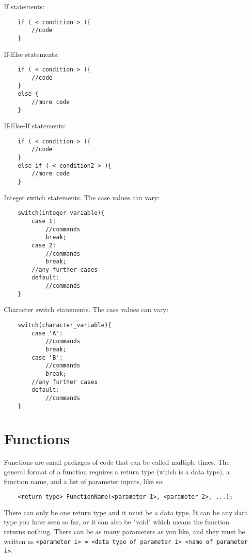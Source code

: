 If statements:
\begin{verbatim}
    if ( < condition > ){
        //code
    }
\end{verbatim}

If-Else statements:
\begin{verbatim}
    if ( < condition > ){
        //code
    }
    else {
        //more code
    }
\end{verbatim}

If-Else-If statements:
\begin{verbatim}
    if ( < condition > ){
        //code
    }
    else if ( < condition2 > ){
        //more code
    }
\end{verbatim}

Integer switch statements. The case values can vary:
\begin{verbatim}
    switch(integer_variable){
        case 1:
            //commands
            break;
        case 2:
            //commands
            break;
        //any further cases
        default:
            //commands
    }
\end{verbatim}

Character switch statements. The case values can vary:
\begin{verbatim}
    switch(character_variable){
        case 'A':
            //commands
            break;
        case 'B':
            //commands
            break;
        //any further cases
        default:
            //commands
    }
\end{verbatim}

\section{Functions}
Functions are small packages of code that can be called multiple times. The general format of a function requires a return type (which is a data type), a function name, and a list of parameter inputs, like so:

\begin{verbatim}
    <return type> FunctionName(<parameter 1>, <parameter 2>, ...);
\end{verbatim}

There can only be one return type and it must be a data type. It can be any data type you have seen so far, or it can also be "void" which means the function returns nothing. There can be as many parameters as you like, and they must be written as \texttt{<parameter i> = <data type of parameter i> <name of parameter i>}. 

